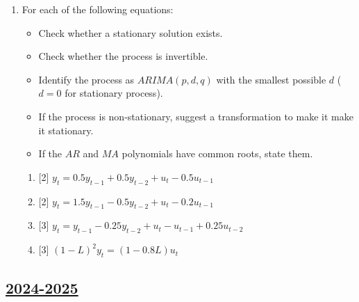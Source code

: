 \begin{enumerate}
\item For each of the following equations:
\begin{itemize}
    \item Check whether a stationary solution exists.
    \item Check whether the process is invertible.
    \item Identify the process as $ARIMA(p,d,q)$ with the smallest possible $d$ ($d=0$ for stationary process).
    \item If the process is non-stationary, suggest a transformation to make it make it stationary.
    \item If the $AR$ and $MA$ polynomials have common roots, state them.
\end{itemize}

\begin{enumerate}
    \item {[2]} \(y_t = 0.5 y_{t-1} + 0.5 y_{t-2} + u_t - 0.5 u_{t-1}\)
    \item {[2]} \(y_t = 1.5 y_{t-1} - 0.5 y_{t-2} + u_t - 0.2 u_{t-1}\)
    \item {[3]} \(y_t = y_{t-1} - 0.25 y_{t-2} + u_t - u_{t-1} + 0.25 u_{t-2}\)
    \item {[3]} \((1 - L)^2 y_t = (1 - 0.8L) u_t\)
\end{enumerate}


\end{enumerate}





\subsection[2024-2025]{\hyperref[sec:sol_kr_03_2024_2025]{2024-2025}}
\label{sec:kr_03_2024_2025} %


